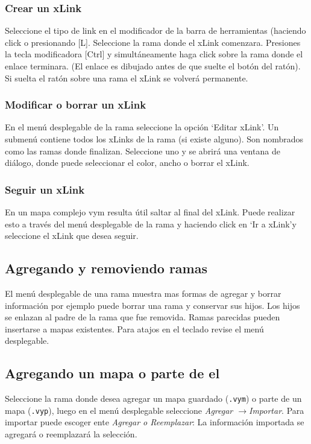 \documentclass{article}
\newcommand{\vym}{{\sc vym }}
\newcommand{\ra}{$\longrightarrow$}
\newcommand{\key}[1]{[#1]}
\begin{document}
\subsubsection*{Crear un xLink}
Seleccione el tipo de link en el modificador de la barra de herramientas (haciendo click o presionando \key{L}. Seleccione la rama donde el xLink comenzara. Presiones la tecla modificadora \key{Ctrl} y simult\'aneamente haga click sobre la rama donde el enlace terminara. (El enlace es dibujado antes de que suelte el bot\'on del rat\'on). Si suelta el rat\'on sobre una rama el xLink se volver\'a permanente.

\subsubsection*{Modificar o borrar un xLink}
En el men\'u desplegable de la rama seleccione la opci\'on \lq Editar xLink\rq. Un submen\'u contiene todos los xLinks de la rama (si existe alguno). Son nombrados como las ramas donde finalizan. Seleccione uno y se abrir\'a una ventana de di\'alogo, donde puede seleccionar el color, ancho o borrar el xLink.

\subsubsection*{Seguir un xLink}
En un mapa complejo \vym resulta \'util saltar al final del xLink. Puede realizar esto a trav\'es del men\'u desplegable de la rama y haciendo click en \lq Ir a xLink\rq y seleccione el xLink que desea seguir.

\subsection{Agregando y removiendo ramas}
El men\'u desplegable de una rama muestra mas formas de agregar y borrar informaci\'on por ejemplo puede borrar una rama y conservar sus hijos.  Los hijos se enlazan al padre de la rama que fue removida. Ramas parecidas pueden insertarse a mapas existentes. Para atajos en el teclado revise el men\'u desplegable.

\subsection{Agregando un mapa o parte de el}
Seleccione la rama donde desea agregar un mapa guardado ({\tt .vym}) o parte de un mapa ({\tt .vyp}), luego en el men\'u desplegable seleccione {\em Agregar \ra Importar}. Para importar puede escoger ente {\em Agregar o Reemplazar}: La informaci\'on importada se agregar\'a o reemplazar\'a la selecci\'on.
\end{document}

